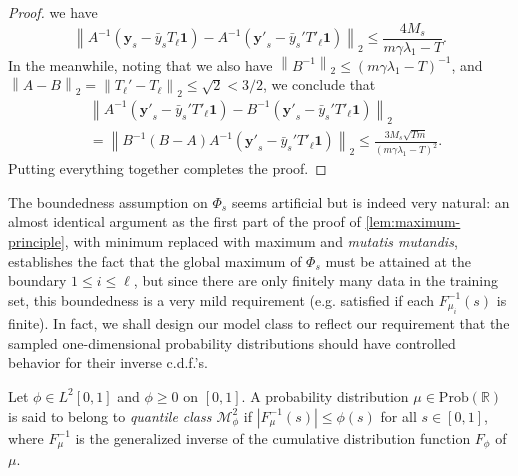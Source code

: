 \documentclass[letterpaper]{article} %
\begin{document}
\begin{proof}
  we have
  \begin{equation*}
    \left\| A^{-1}\left(\mathbf{y}_s-\bar{y}_sT_\ell\mathbf{1}\right)-A^{-1}\left(\mathbf{y'}_s-\bar{y}_s'T'_\ell\mathbf{1}\right) \right\|_2\leq \frac{4M_s}{m\gamma\lambda_1-T}.
  \end{equation*}
  In the meanwhile, noting that we also have $\left\| B^{-1} \right\|_2\leq \left( m\gamma\lambda_1-T \right)^{-1}$, and $\left\| A-B \right\|_2=\left\| T_{\ell}'-T_{\ell} \right\|_2 \leq \sqrt{2}<3/2$, we conclude that
  \begin{equation*}
    \begin{aligned}
      &\left\| A^{-1}\left(\mathbf{y'}_s-\bar{y}_s'T'_\ell\mathbf{1}\right)-B^{-1}\left(\mathbf{y'}_s-\bar{y}_s'T'_\ell\mathbf{1}\right) \right\|_2\\
      &=\left\| B^{-1} \left( B-A \right) A^{-1}\left(\mathbf{y'}_s-\bar{y}_s'T'_\ell\mathbf{1}\right)\right\|_2\leq \frac{3M_s\sqrt{Tm}}{\left( m\gamma\lambda_1-T \right)^2}.
    \end{aligned}
  \end{equation*}
  Putting everything together completes the proof.
\end{proof}

The boundedness assumption on $\Phi_s$ seems artificial but is indeed very natural: an almost identical argument as the first part of the proof of \eqref{lem:maximum-principle}, with minimum replaced with maximum and \emph{mutatis mutandis}, establishes the fact that the global maximum of $\Phi_s$ must be attained at the boundary $1\leq i\leq \ell$, but since there are only finitely many data in the training set, this boundedness is a very mild requirement (e.g. satisfied if each $F_{\mu_i}^{-1} \left( s \right)$ is finite). In fact, we shall design our model class to reflect our requirement that the sampled one-dimensional probability distributions should have controlled behavior for their inverse c.d.f.'s.

\begin{definition}
  Let $\phi\in L^2 \left[ 0,1 \right]$ and $\phi\geq 0$ on $\left[ 0,1 \right]$. A probability distribution $\mu\in\mathrm{Prob}\left( \mathbb{R} \right)$ is said to belong to \emph{quantile class $\mathcal{M}_{\phi}^2$} if $\left|F_{\mu}^{-1}\left( s \right)\right|\leq \phi \left( s \right)$ for all $s\in \left[0,1\right]$, where $F_{\mu}^{-1}$ is the generalized inverse of the cumulative distribution function $F_{\phi}$ of $\mu$.
\end{definition}
\end{document}

